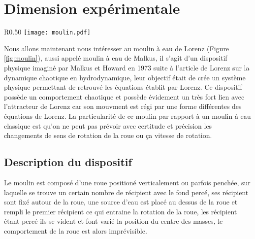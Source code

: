 \section{Dimension expérimentale}
\begin{wrapfigure}{R}{0.50\textwidth}
    \centering
    \texttt{[image: moulin.pdf]}
    \caption{\label{fig:moulin}Moulin de Lorenz réalisé par l'université de Harvard} 
\end{wrapfigure}
Nous allons maintenant nous intéresser au moulin à eau de Lorenz (Figure \ref{fig:moulin}), aussi appelé moulin à eau de Malkus, il s'agit d'un dispositif physique imaginé par Malkus et Howard en 1973 suite à l'article de
Lorenz sur la dynamique chaotique en hydrodynamique, leur objectif était de crée un système physique permettant de retrouvé les équations établit par Lorenz. Ce dispositif possède un comportement chaotique et possède évidement un très fort lien avec l'attracteur de Lorenz car son mouvment est régi par une forme différentes des équations de Lorenz. La particularité de ce moulin par rapport à un moulin à eau classique est qu'on ne peut pas prévoir avec certitude et précision les changements de sens de rotation de la roue ou ça vitesse de rotation.

\subsection{Description du dispositif}
Le moulin est composé d'une roue positioné verticalement ou parfois penchée, sur laquelle se trouve un certain nombre de récipient avec le fond percé, ses récipient sont fixé autour de la roue, une source d'eau est placé au dessus de la roue et rempli le premier récipient ce qui entraine la rotation de la roue, les récipient étant percé ils se vident et font varié la position du centre des masses, le comportement de la roue est alors imprévisible.

